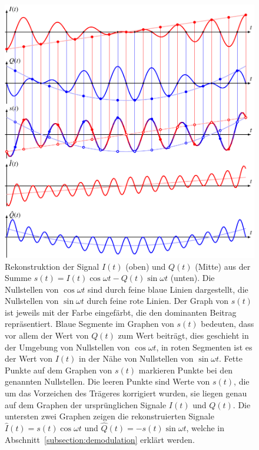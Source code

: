 \begin{figure}
\centering
\includegraphics{applications/qam/images/sep.pdf}
\caption{Rekonstruktion der Signal $I(t)$ (oben) und $Q(t)$ (Mitte)
aus der Summe $s(t) = I(t)\cos\omega t - Q(t)\sin\omega t$ (unten).
Die Nullstellen von $\cos\omega t$ sind durch feine blaue Linien 
dargestellt, die Nullstellen von $\sin\omega t$ durch feine rote Linien.
Der Graph von $s(t)$ ist jeweils mit der Farbe eingefärbt, die den
dominanten Beitrag repräsentiert.
Blaue Segmente im Graphen von $s(t)$ bedeuten, dass vor allem der Wert
von $Q(t)$ zum Wert beiträgt, dies geschieht in der Umgebung von
Nullstellen von $\cos\omega t$, in roten Segmenten ist es der Wert von
$I(t)$ in der Nähe von Nullstellen von $\sin\omega t$.
Fette Punkte auf dem Graphen von $s(t)$ markieren Punkte bei den
genannten Nullstellen.
Die leeren Punkte sind Werte von $s(t)$, die um das Vorzeichen des
Trägeres korrigiert wurden, sie liegen genau auf dem Graphen der
ursprünglichen Signale $I(t)$ und $Q(t)$.
Die untersten zwei Graphen zeigen die rekonstruierten Signale
$\hat{I}(t)=s(t) \cos\omega t$ und $\hat{Q}(t) = -s(t) \sin\omega t$, 
welche in Abschnitt~\ref{subsection:demodulation} erklärt werden.
\label{figure:qam:sep}}
\end{figure}

